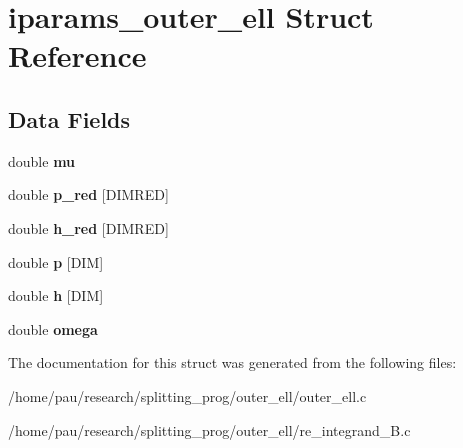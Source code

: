 \hypertarget{structiparams__outer__ell}{
\section{iparams\_\-outer\_\-ell Struct Reference}
\label{structiparams__outer__ell}
}
\subsection*{Data Fields}
\begin{DoxyCompactItemize}
\item 
\hypertarget{structiparams__outer__ell_a74577585cf12d1712ab9c57616d49205}{
double {\bfseries mu}}
\label{structiparams__outer__ell_a74577585cf12d1712ab9c57616d49205}

\item 
\hypertarget{structiparams__outer__ell_a88567b2f50c98a92ae32ac04d6d47c47}{
double {\bfseries p\_\-red} \mbox{[}DIMRED\mbox{]}}
\label{structiparams__outer__ell_a88567b2f50c98a92ae32ac04d6d47c47}

\item 
\hypertarget{structiparams__outer__ell_ae25ee8c1a7cbb32f42a698afbb5a38c7}{
double {\bfseries h\_\-red} \mbox{[}DIMRED\mbox{]}}
\label{structiparams__outer__ell_ae25ee8c1a7cbb32f42a698afbb5a38c7}

\item 
\hypertarget{structiparams__outer__ell_a922729488d20297775737f3221dfb3da}{
double {\bfseries p} \mbox{[}DIM\mbox{]}}
\label{structiparams__outer__ell_a922729488d20297775737f3221dfb3da}

\item 
\hypertarget{structiparams__outer__ell_a95177a5a22dcb6abff5fa526bf316e6e}{
double {\bfseries h} \mbox{[}DIM\mbox{]}}
\label{structiparams__outer__ell_a95177a5a22dcb6abff5fa526bf316e6e}

\item 
\hypertarget{structiparams__outer__ell_a98ecc32b7ac0cf654d9f883cbe5cab35}{
double {\bfseries omega}}
\label{structiparams__outer__ell_a98ecc32b7ac0cf654d9f883cbe5cab35}

\end{DoxyCompactItemize}


The documentation for this struct was generated from the following files:\begin{DoxyCompactItemize}
\item 
/home/pau/research/splitting\_\-prog/outer\_\-ell/outer\_\-ell.c\item 
/home/pau/research/splitting\_\-prog/outer\_\-ell/re\_\-integrand\_\-B.c\end{DoxyCompactItemize}
